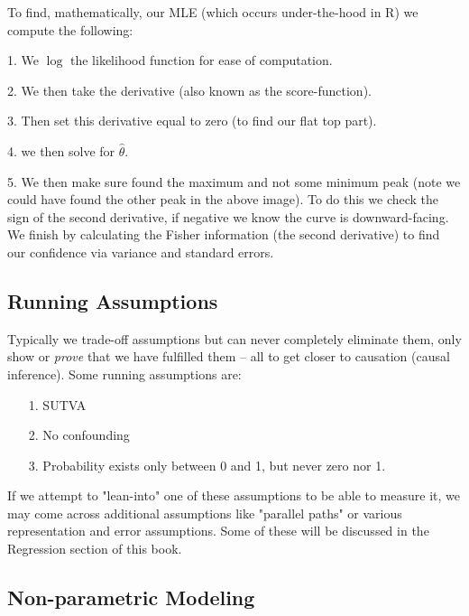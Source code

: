 \documentclass[12pt]{article}\usepackage[]{graphicx}\usepackage[]{color}
\begin{document}
\begin{flushleft}
To find, mathematically, our MLE (which occurs under-the-hood in R) we compute the following: 

\begin{list}{}{}
\item[1.] We $\log$ the likelihood function for ease of computation.
\item[2.] We then take the derivative (also known as the score-function).
\item[3.] Then set this derivative equal to zero (to find our flat top part).
\item[4.] we then solve for $\hat{\theta}$.
\item[5.] We then make sure found the maximum and not some minimum peak (note we could have found the other peak in the above image). To do this we check the sign of the second derivative, if negative we know the curve is downward-facing. We finish by calculating the Fisher information (the second derivative) to find our confidence via variance and standard errors.
\end{list}





\subsection{Running Assumptions}


Typically we trade-off assumptions but can never completely eliminate them, only show or \textit{prove} that we have fulfilled them -- all to get closer to causation (causal inference). Some running assumptions are:

\begin{itemize}
\item[1.] SUTVA
\item[2.] No confounding
\item[3.] Probability exists only between 0 and 1, but never zero nor 1.
\end{itemize}

\noindent If we attempt to "lean-into" one of these assumptions to be able to measure it, we may come across additional assumptions like "parallel paths" or various representation and error assumptions. Some of these will be discussed in the Regression section of this book.


\subsection{Non-parametric Modeling}


\end{flushleft}
\end{document}
